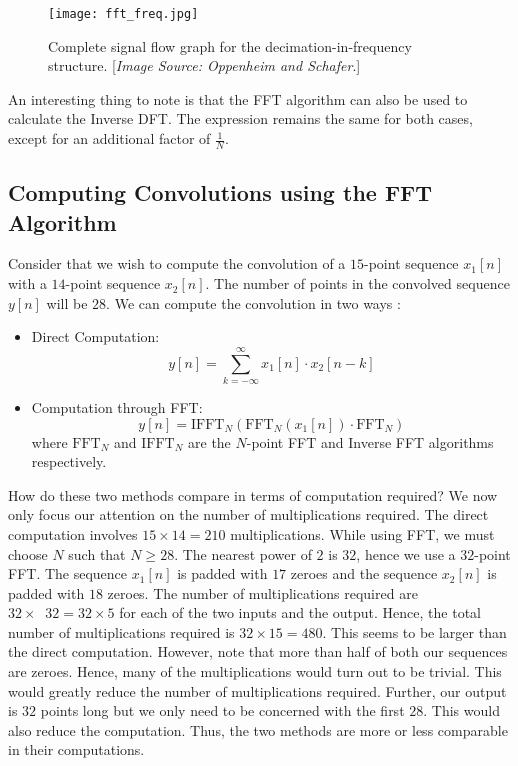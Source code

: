 \documentclass{article}
\theoremstyle{definition}
\newcommand*{\logtwo}{\mathop{\log_{2}}}
\begin{document}
\begin{figure}[!h]
    \centering
    \texttt{[image: fft\_freq.jpg]}
    \caption{Complete signal flow graph for the decimation-in-frequency structure. [\textit{Image Source: Oppenheim and Schafer}.]}
    \label{fig:fft_freq}
\end{figure}

An interesting thing to note is that the FFT algorithm can also be used to calculate the Inverse DFT. The expression remains the same for both cases, except for an additional factor of $\frac{1}{N}$. 

\subsection{Computing Convolutions using the FFT Algorithm}

Consider that we wish to compute the convolution of a $15$-point sequence $x_1[n]$ with a $14$-point sequence $x_2[n]$. The number of points in the convolved sequence $y[n]$ will be $28$. We can compute the convolution in two ways :
\begin{itemize}
    \item Direct Computation:
    \[
        y[n] = \sum_{k=-\infty}^{\infty} x_1[n] \cdot x_2[n-k]
    \]
    \item Computation through FFT:
    \[
        y[n] = \text{IFFT}_{N} \left( \text{FFT}_{N}(x_1[n]) \cdot \text{FFT}_{N} \right)
    \]
    where $\text{FFT}_{N}$ and $\text{IFFT}_{N}$ are the $N$-point FFT and Inverse FFT algorithms respectively. 
\end{itemize}

How do these two methods compare in terms of computation required? We now only focus our attention on the number of multiplications required. The direct computation involves $15 \times 14 = 210$ multiplications. While using FFT, we must choose $N$ such that $N \geq 28$. The nearest power of $2$ is $32$, hence we use a $32$-point FFT. The sequence $x_1[n]$ is padded with $17$ zeroes and the sequence $x_2[n]$ is padded with $18$ zeroes. The number of multiplications required are $32 \times \logtwo 32 = 32 \times 5$ for each of the two inputs and the output. Hence, the total number of multiplications required is $32 \times 15 = 480$. This seems to be larger than the direct computation. However, note that more than half of both our sequences are zeroes. Hence, many of the multiplications would turn out to be trivial. This would greatly reduce the number of multiplications required. Further, our output is $32$ points long but we only need to be concerned with the first $28$. This would also reduce the computation. Thus, the two methods are more or less comparable in their computations. \medskip
\end{document}
